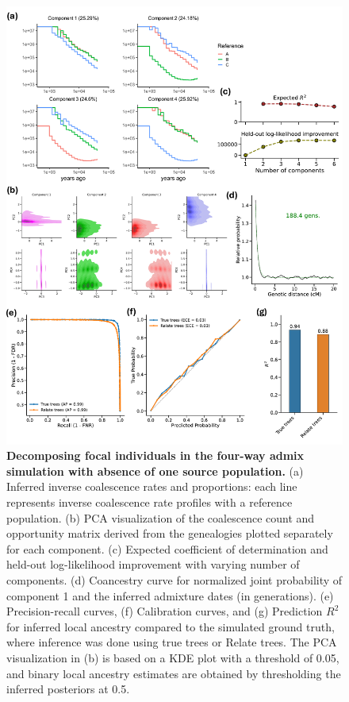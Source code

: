 \begin{figure}[h!]
    \centering
    \includegraphics[width=\linewidth]{figures/gb_sims/gb_sim_4way_ghost.pdf}
    \captionsetup{width=\textwidth+3cm}     \caption{
    \footnotesize
    \textbf{Decomposing focal individuals in the four-way admix simulation with absence of one source population.} (a) Inferred inverse coalescence rates and proportions: each line represents inverse coalescence rate profiles with a reference population. (b) PCA visualization of the coalescence count and opportunity matrix derived from the genealogies plotted separately for each component. (c) Expected coefficient of determination and held-out log-likelihood improvement with varying number of components. (d) Coancestry curve for normalized joint probability of component 1 and the inferred admixture dates (in generations). (e) Precision-recall curves, (f) Calibration curves, and (g) Prediction $R^2$ for inferred local ancestry compared to the simulated ground truth, where inference was done using true trees or Relate trees. The PCA visualization in (b) is based on a KDE plot with a threshold of 0.05, and binary local ancestry estimates are obtained by thresholding the inferred posteriors at 0.5.
    }
    \label{fig:gb_sim_four_ghost}
\end{figure}


